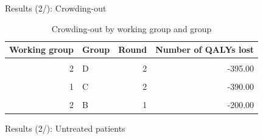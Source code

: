 \documentclass[
  ignorenonframetext,
]{beamer}
\begin{document}
\begin{frame}{Results (2/): Crowding-out}
\protect\hypertarget{results-2-crowding-out}{}
\begin{table}[H]

\caption{\label{tab:res2}Crowding-out by working group and group}
\centering
\begin{tabular}[t]{rlrr}
\toprule
Working group & Group & Round & Number of QALYs lost\\
\midrule
\cellcolor{gray!6}{1} & \cellcolor{gray!6}{B} & \cellcolor{gray!6}{2} & \cellcolor{gray!6}{-400.00}\\
2 & D & 2 & -395.00\\
\cellcolor{gray!6}{1} & \cellcolor{gray!6}{C} & \cellcolor{gray!6}{1} & \cellcolor{gray!6}{-359.38}\\
1 & C & 2 & -390.00\\
\cellcolor{gray!6}{1} & \cellcolor{gray!6}{A} & \cellcolor{gray!6}{1} & \cellcolor{gray!6}{-100.00}\\
2 & B & 1 & -200.00\\
\bottomrule
\end{tabular}
\end{table}
\end{frame}

\begin{frame}{Results (2/): Untreated patients}
\protect\hypertarget{results-2-untreated-patients}{}
\begin{table}[H]

\caption{\label{tab:res3}Number of patients without treatment per working group, group, and round}
\centering
{}
\end{table}
\end{frame}
\end{document}
